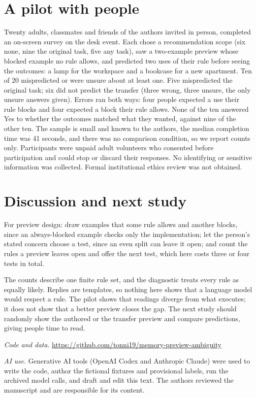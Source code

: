 \documentclass[manuscript,review]{acmart}
\begin{document}
\section{A pilot with people}
Twenty adults, classmates and friends of the authors invited in person, completed an on-screen survey on the desk event. Each chose a recommendation scope (six none, nine the original task, five any task), saw a two-example preview whose blocked example no rule allows, and predicted two uses of their rule before seeing the outcomes: a lamp for the workspace and a bookcase for a new apartment. Ten of 20 mispredicted or were unsure about at least one. Five mispredicted the original task; six did not predict the transfer (three wrong, three unsure, the only unsure answers given). Errors ran both ways: four people expected a use their rule blocks and four expected a block their rule allows. None of the ten answered Yes to whether the outcomes matched what they wanted, against nine of the other ten. The sample is small and known to the authors, the median completion time was 41 seconds, and there was no comparison condition, so we report counts only. Participants were unpaid adult volunteers who consented before participation and could stop or discard their responses. No identifying or sensitive information was collected. Formal institutional ethics review was not obtained.

\section{Discussion and next study}
For preview design: draw examples that some rule allows and another blocks, since an always-blocked example checks only the implementation; let the person's stated concern choose a test, since an even split can leave it open; and count the rules a preview leaves open and offer the next test, which here costs three or four tests in total.

The counts describe one finite rule set, and the diagnostic treats every rule as equally likely. Replies are templates, so nothing here shows that a language model would respect a rule. The pilot shows that readings diverge from what executes; it does not show that a better preview closes the gap. The next study should randomly show the authored or the transfer preview and compare predictions, giving people time to read.

\textit{Code and data.} \url{https://github.com/tonni19/memory-preview-ambiguity}

\textit{AI use.} Generative AI tools (OpenAI Codex and Anthropic Claude) were used to write the code, author the fictional fixtures and provisional labels, run the archived model calls, and draft and edit this text. The authors reviewed the manuscript and are responsible for its content.
\clearpage


\end{document}
